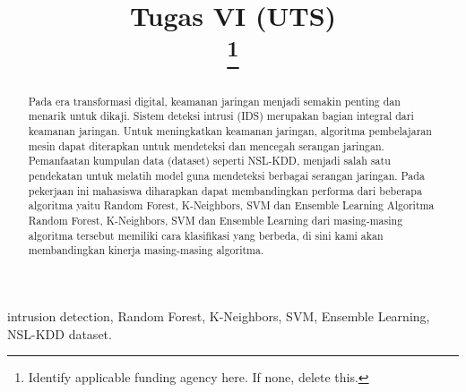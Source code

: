 \documentclass[conference]{IEEEtran}
\begin{document}
\title{Tugas VI (UTS)\\
{\footnotesize \textsuperscript{}}
\thanks{Identify applicable funding agency here. If none, delete this.}
}

\author{
}

\maketitle

\begin{abstract}
Pada era transformasi digital, keamanan jaringan
menjadi semakin penting dan menarik untuk dikaji. Sistem
deteksi intrusi (IDS) merupakan bagian integral dari keamanan jaringan. Untuk meningkatkan keamanan jaringan, algoritma pembelajaran mesin dapat diterapkan untuk mendeteksi
dan mencegah serangan jaringan. Pemanfaatan kumpulan data
(dataset) seperti NSL-KDD, menjadi salah satu pendekatan untuk melatih model guna mendeteksi berbagai serangan jaringan.
Pada pekerjaan ini mahasiswa diharapkan dapat membandingkan performa dari beberapa algoritma yaitu Random Forest,
K-Neighbors, SVM dan Ensemble Learning
Algoritma Random Forest, K-Neighbors, SVM dan Ensemble
Learning dari masing-masing algoritma tersebut memiliki cara
klasifikasi yang berbeda, di sini kami akan membandingkan
kinerja masing-masing algoritma.
\end{abstract}

\begin{IEEEkeywords}
intrusion detection, Random Forest, K-Neighbors, SVM, Ensemble Learning, NSL-KDD dataset.
\end{IEEEkeywords}
\end{document}
